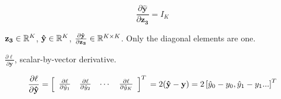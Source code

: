 
\begin{equation}
    \frac{\partial \mathbf{\hat{y}}}{\partial \mathbf{z_3}}
    =
    I_{K}
\end{equation}

$\mathbf{z_3} \in \mathbb{R}^{K} $, $\mathbf{\hat{y}} \in \mathbb{R}^{K}$, $\frac{\partial \mathbf{\hat{y}}}{\partial \mathbf{z_3}} \in \mathbb{R}^{K \times K} $. Only the diagonal elements are one.




$\frac{\partial \ell}{\partial \bm{\hat y}}$, scalar-by-vector derivative.

\begin{equation}
    \frac{\partial \ell }{\partial \mathbf{\hat{y}}}=\left[\begin{array}{cccc}
    \frac{\partial \ell}{\partial \hat{y}_{1}} & \frac{\partial \ell}{\partial \hat{y}_{2}} & \cdots & \frac{\partial \ell}{\partial \hat{y}_{K}} \\
    \end{array}\right]^T \\
    = 2 (\mathbf{\hat{y}} - \mathbf{y})
    = 2 \left[\hat{y}_0- {y}_0, \hat{y}_1 - {y}_1  ... \right]^T
\end{equation}

